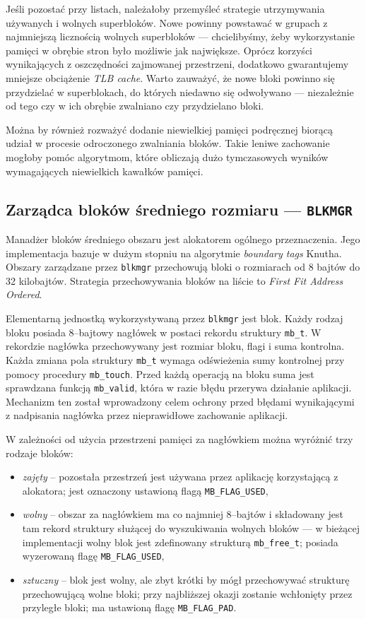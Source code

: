 \documentclass[12pt,a4paper,titlepage,twoside]{mwart}
\begin{document}
Jeśli pozostać przy listach, należałoby przemyśleć strategie utrzymywania
używanych i wolnych superbloków. Nowe powinny powstawać w grupach z najmniejszą
licznością wolnych superbloków --- chcielibyśmy, żeby wykorzystanie pamięci w
obrębie stron było możliwie jak największe. Oprócz korzyści wynikających z
oszczędności zajmowanej przestrzeni, dodatkowo gwarantujemy mniejsze obciążenie
\textit{TLB cache}. Warto zauważyć, że nowe bloki powinno się przydzielać w
superblokach, do których niedawno się odwoływano --- niezależnie od tego czy
w ich obrębie zwalniano czy przydzielano bloki.

Można by również rozważyć dodanie niewielkiej pamięci podręcznej biorącą udział
w procesie odroczonego zwalniania bloków. Takie leniwe zachowanie mogłoby pomóc
algorytmom, które obliczają dużo tymczasowych wyników wymagających niewielkich
kawałków pamięci.

\subsection{Zarządca bloków średniego rozmiaru --- \texttt{BLKMGR}}

Manadżer bloków średniego obszaru jest alokatorem ogólnego przeznaczenia. Jego
implementacja bazuje w dużym stopniu na algorytmie \textit{boundary tags}
Knutha. Obszary zarządzane przez \texttt{blkmgr} przechowują bloki o
rozmiarach od 8 bajtów do 32 kilobajtów. Strategia przechowywania bloków na
liście to \textit{First Fit Address Ordered}.

Elementarną jednostką wykorzystywaną przez \texttt{blkmgr} jest blok. Każdy
rodzaj bloku posiada $8$--bajtowy nagłówek w postaci rekordu struktury
\texttt{mb\_t}. W rekordzie nagłówka przechowywany jest rozmiar bloku, flagi i
suma kontrolna. Każda zmiana pola struktury \verb+mb_t+ wymaga odświeżenia sumy
kontrolnej przy pomocy procedury \verb+mb_touch+. Przed każdą operacją na bloku
suma jest sprawdzana funkcją \verb+mb_valid+, która w razie błędu przerywa
działanie aplikacji. Mechanizm ten został wprowadzony celem ochrony przed
błędami wynikającymi z nadpisania nagłówka przez nieprawidłowe zachowanie
aplikacji.

W zależności od użycia przestrzeni pamięci za nagłówkiem można wyróżnić trzy
rodzaje bloków:
\begin{itemize}
\item \textit{zajęty} -- pozostała przestrzeń jest używana przez aplikację
korzystającą z alokatora; jest oznaczony ustawioną flagą \verb+MB_FLAG_USED+,
\item \textit{wolny} -- obszar za nagłówkiem ma co najmniej $8$--bajtów i
składowany jest tam rekord struktury służącej do wyszukiwania wolnych bloków
--- w bieżącej implementacji wolny blok jest zdefinowany strukturą
\verb+mb_free_t+; posiada wyzerowaną flagę \verb+MB_FLAG_USED+,
\item \textit{sztuczny} -- blok jest wolny, ale zbyt krótki by mógł
przechowywać strukturę przechowującą wolne bloki; przy najbliższej okazji
zostanie wchłonięty przez przyległe bloki; ma ustawioną flagę
\verb+MB_FLAG_PAD+.
\end{itemize}
\end{document}
